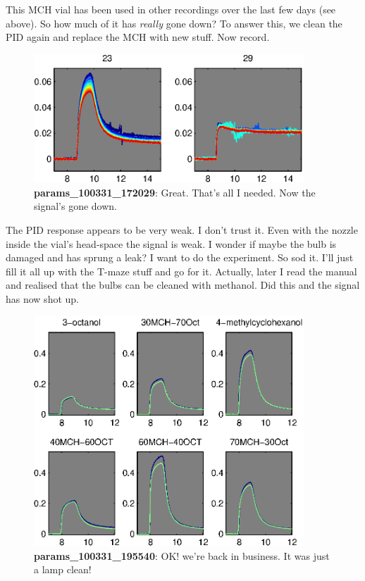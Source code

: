 \documentclass[a4paper]{report}
\begin{document}
This MCH vial has been used in other recordings over the last few days
(see above). So how much of it has \textit{really} gone down? To
answer this, we clean the PID again and replace the MCH with new
stuff. Now record. 
\begin{figure}[h]
\centering
\includegraphics[width=4in]{params_100331_172029.eps}
\caption{\textbf{params\_100331\_172029}: Great. That's all I
  needed. Now the signal's gone down. }
\end{figure}


The PID response appears to be very weak. I don't trust it. Even with
the nozzle inside the vial's head-space the signal is weak. I wonder
if maybe the bulb is damaged and has sprung a leak? I want to do the
experiment. So sod it. I'll just fill it all up with the T-maze stuff
and go for it. Actually, later I read the manual and realised that the
bulbs can be cleaned with methanol. Did this and the signal has now
shot up. 

\begin{figure}[h]
\centering
\includegraphics[width=4in]{params_100331_195540.eps}
\caption{\textbf{params\_100331\_195540}: OK! we're back in
  business. It was just a lamp clean!}
\end{figure}
\end{document}
